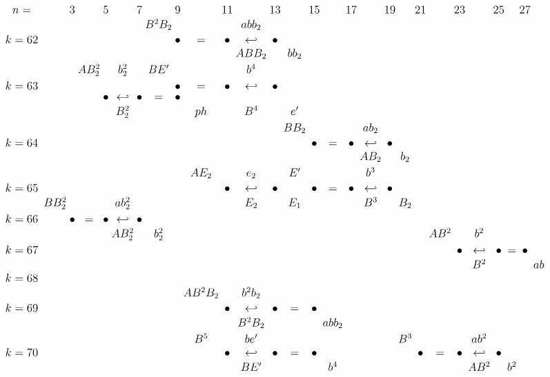 \documentclass{article}
\begin{document}
\(
\begin{tikzcd}[
nodes={font=\large,inner sep=0pt},
row sep=0.2cm,
column sep=0.1cm
]
n= && & 3 & & 5 & & 7 & & 9 & & 11 & & 13 & & 15 & & 17 && 19 && 21 && 23 && 25 && 27\\
&& && && && B^2B_2 && && abb_2 \\
k=62 &&& && && && \bullet &=& \bullet &\hookleftarrow& \bullet \\
&& && && && && && ABB_2 && bb_2 \\
&& && AB_2^2 && b_2^2 && BE' && && b^4 \\
k=63 &&& && && && \bullet &=& \bullet &\hookleftarrow& \bullet \\
&&& && \bullet &\hookleftarrow& \bullet &=& \bullet \\
&& && && B_2^2 && && ph && B^4 && e' \\
&& && && && && && && BB_2 && && ab_2 \\
k=64 &&& && && && && && && \bullet &=& \bullet &\hookleftarrow& \bullet \\
&& && &&  && && && && && && AB_2 && b_2 \\
&& && && && && AE_2 && e_2 && E' && && b^3 \\
k=65 &&& && && && && \bullet &\hookleftarrow& \bullet && \bullet &=& \bullet &\hookleftarrow& \bullet \\
&& BB_2^2 && && ab_2^2 && && && E_2 && E_1 && && B^3 && B_2 \\
k=66 &&& \bullet &=& \bullet &\hookleftarrow& \bullet \\
&& && && AB_2^2 && b_2^2 && && && && && && && AB^2 && b^2 \\
k=67 &&& && && && && && && && && && && \bullet &\hookleftarrow& \bullet &=& \bullet \\
&& && && && && && && && && && && && B^2 && && ab \\
k=68 &&& && && &&  \\
&& && && && && AB^2B_2 && b^2b_2 \\
k=69 &&& && && && && \bullet &\hookleftarrow& \bullet &=& \bullet \\
&& && && && && && B^2B_2 && && abb_2 \\
&& && && && && B^5 && be' && && && && B^3 && && ab^2 \\
k=70 &&& && && && &&\bullet &\hookleftarrow& \bullet &=& \bullet && && && \bullet &=& \bullet &\hookleftarrow& \bullet \\
&& && && && && && BE' && && b^4 && && && && AB^2 && b^2 \\
\\
\end{tikzcd}
\)
\end{document}
